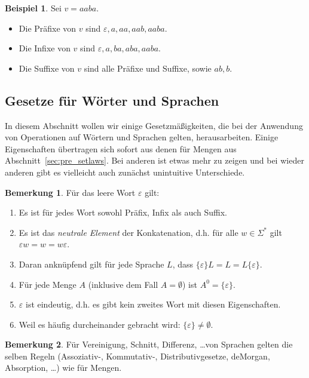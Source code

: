 \documentclass[11pt, a4paper]{article}
\theoremstyle{definition}
\newtheorem{example}[definition]{Beispiel}
\newtheorem*{remark*}{Bemerkung}
\theoremstyle{plain}
\numberwithin{equation}{section}
\begin{document}
\begin{example}
	Sei \( v = aaba \).
	\begin{itemize}
		\item Die Präfixe von \( v \) sind \( \varepsilon, a, aa, aab, aaba \).
		\item Die Infixe von \( v \) sind \( \varepsilon, a, ba, aba, aaba \).
		\item Die Suffixe von \( v \) sind alle Präfixe und Suffixe, sowie \( ab, b \).
	\end{itemize}
\end{example}


\subsection{Gesetze für Wörter und Sprachen}\label{sec:awl_wordlaws}
In diesem Abschnitt wollen wir einige Gesetzmäßigkeiten, die bei der Anwendung von Operationen auf Wörtern und Sprachen gelten, herausarbeiten. Einige Eigenschaften übertragen sich sofort aus denen für Mengen aus Abschnitt~\ref{sec:pre_setlaws}. Bei anderen ist etwas mehr zu zeigen und bei wieder anderen gibt es vielleicht auch zunächst unintuitive Unterschiede.
\begin{remark*}
	Für das leere Wort \( \varepsilon \) gilt:
	\begin{enumerate}
		\item Es ist für jedes Wort sowohl Präfix, Infix als auch Suffix.
		\item Es ist das \textit{neutrale Element} der Konkatenation, d.h. für alle \( w \in \Sigma^\ast \) gilt \( \varepsilon w = w = w \varepsilon \).
		\item Daran anknüpfend gilt für jede Sprache \( L \), dass \(  \{ \varepsilon \} L = L = L  \{ \varepsilon \} \).
		\item Für jede Menge \( A \) (inklusive dem Fall \( A = \emptyset \)) ist \( A^0 = \{ \varepsilon \} \).
		\item \( \varepsilon \) ist eindeutig, d.h. es gibt kein zweites Wort mit diesen Eigenschaften.
		\item Weil es häufig durcheinander gebracht wird: \( \{ \varepsilon \} \neq \emptyset \).
	\end{enumerate}
\end{remark*}

\begin{remark*}
	Für Vereinigung, Schnitt, Differenz, \ldots von Sprachen gelten die selben Regeln (Assoziativ-, Kommutativ-, Distributivgesetze, deMorgan, Absorption, \ldots) wie für Mengen.
\end{remark*}
\end{document}
